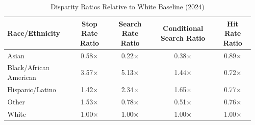 \begin{table}[htbp]
\caption{Disparity Ratios Relative to White Baseline (2024)}
\label{tab:disparities}
\begin{tabular}{lcccc}
\toprule\toprule
Race/Ethnicity & Stop Rate Ratio & Search Rate Ratio & Conditional Search Ratio & Hit Rate Ratio \\
\midrule\midrule
Asian & 0.58$\times$ & 0.22$\times$ & 0.38$\times$ & 0.89$\times$ \\
Black/African American & 3.57$\times$ & 5.13$\times$ & 1.44$\times$ & 0.72$\times$ \\
Hispanic/Latino & 1.42$\times$ & 2.34$\times$ & 1.65$\times$ & 0.77$\times$ \\
Other & 1.53$\times$ & 0.78$\times$ & 0.51$\times$ & 0.76$\times$ \\
White & 1.00$\times$ & 1.00$\times$ & 1.00$\times$ & 1.00$\times$ \\
\bottomrule\bottomrule
\end{tabular}
\end{table}
